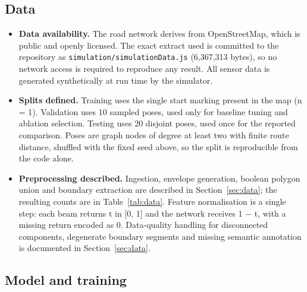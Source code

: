 \documentclass[conference]{IEEEtran}
\begin{document}
\subsection{Data}

\begin{itemize}
\item[$\boxtimes$] \textbf{Data availability.} The road network derives from OpenStreetMap, which is public and openly licensed. The exact extract used is committed to the repository as \texttt{simulation/simulationData.js} (6,367,313 bytes), so no network access is required to reproduce any result. All sensor data is generated synthetically at run time by the simulator.
\item[$\boxtimes$] \textbf{Splits defined.} Training uses the single start marking present in the map (n = 1). Validation uses 10 sampled poses, used only for baseline tuning and ablation selection. Testing uses 20 disjoint poses, used once for the reported comparison. Poses are graph nodes of degree at least two with finite route distance, shuffled with the fixed seed above, so the split is reproducible from the code alone.
\item[$\boxtimes$] \textbf{Preprocessing described.} Ingestion, envelope generation, boolean polygon union and boundary extraction are described in Section~\ref{sec:data}; the resulting counts are in Table~\ref{tab:data}. Feature normalisation is a single step: each beam returns t in [0, 1] and the network receives 1 − t, with a missing return encoded as 0. Data-quality handling for disconnected components, degenerate boundary segments and missing semantic annotation is documented in Section~\ref{sec:data}.
\end{itemize}

\subsection{Model and training}
\end{document}
